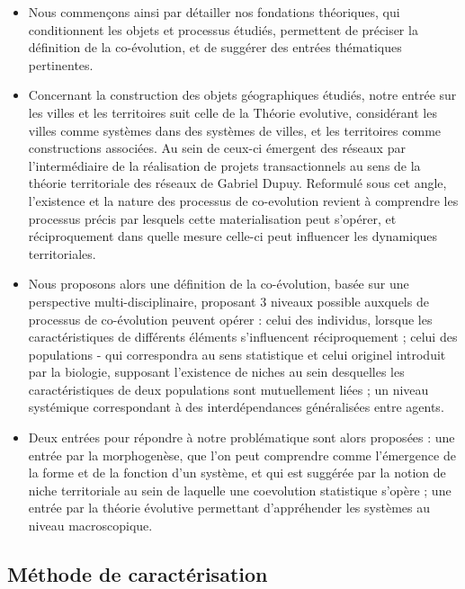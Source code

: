 \documentclass[11pt]{article}
\begin{document}
\begin{itemize}
	\item Nous commençons ainsi par détailler nos fondations théoriques, qui conditionnent les objets et processus étudiés, permettent de préciser la définition de la co-évolution, et de suggérer des entrées thématiques pertinentes.
	\item Concernant la construction des objets géographiques étudiés, notre entrée sur les villes et les territoires suit celle de la Théorie evolutive, considérant les villes comme systèmes dans des systèmes de villes, et les territoires comme constructions associées. Au sein de ceux-ci émergent des réseaux par l'intermédiaire de la réalisation de projets transactionnels au sens de la théorie territoriale des réseaux de Gabriel Dupuy. Reformulé sous cet angle, l'existence et la nature des processus de co-evolution revient à comprendre les processus précis par lesquels cette materialisation peut s'opérer, et réciproquement dans quelle mesure celle-ci peut influencer les dynamiques territoriales.
	\item Nous proposons alors une définition de la co-évolution, basée sur une perspective multi-disciplinaire, proposant 3 niveaux possible auxquels de processus de co-évolution peuvent opérer : celui des individus, lorsque les caractéristiques de différents éléments s'influencent réciproquement ; celui des populations - qui correspondra au sens statistique et celui originel introduit par la biologie, supposant l'existence de niches au sein desquelles les caractéristiques de deux populations sont mutuellement liées ; un niveau systémique correspondant à des interdépendances généralisées entre agents.
	\item Deux entrées pour répondre à notre problématique sont alors proposées : une entrée par la morphogenèse, que l'on peut comprendre comme l'émergence de la forme et de la fonction d'un système, et qui est suggérée par la notion de niche territoriale au sein de laquelle une coevolution statistique s'opère ; une entrée par la théorie évolutive permettant d'appréhender les systèmes au niveau macroscopique.
\end{itemize}







\subsection*{Méthode de caractérisation}
\end{document}
